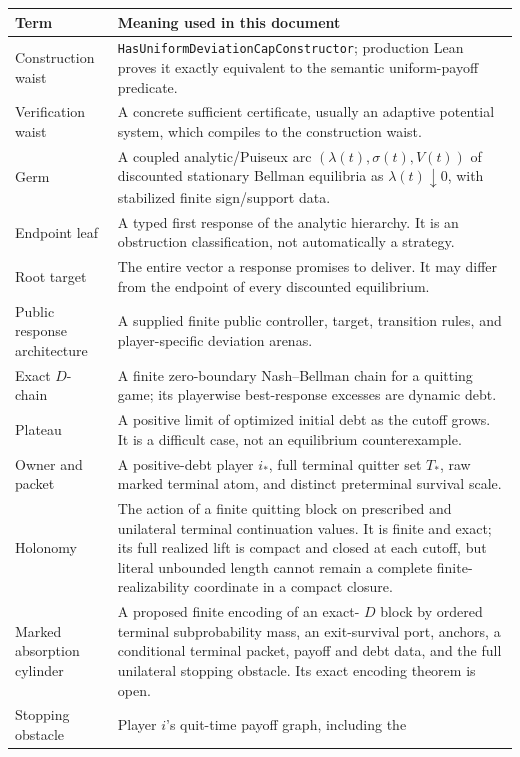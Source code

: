 \documentclass[11pt]{article}
\begin{document}
\begin{longtable}{@{}p{}p{}@{}}
\toprule
Term & Meaning used in this document\\
\midrule
\endhead
Construction waist & \texttt{HasUniformDeviationCapConstructor}; production
Lean proves it exactly equivalent to the semantic uniform-payoff predicate.\\
Verification waist & A concrete sufficient certificate, usually an adaptive
potential system, which compiles to the construction waist.\\
Germ & A coupled analytic/Puiseux arc
\((\lambda(t),\sigma(t),V(t))\) of discounted stationary Bellman equilibria
as \(\lambda(t)\downarrow0\), with stabilized finite sign/support data.\\
Endpoint leaf & A typed first response of the analytic hierarchy.  It is an
obstruction classification, not automatically a strategy.\\
Root target & The entire vector a response promises to deliver.  It may differ
from the endpoint of every discounted equilibrium.\\
Public response architecture & A supplied finite public controller, target,
transition rules, and player-specific deviation arenas.\\
Exact \(D\)-chain & A finite zero-boundary Nash--Bellman chain for a quitting
game; its playerwise best-response excesses are dynamic debt.\\
Plateau & A positive limit of optimized initial debt as the cutoff grows.
It is a difficult case, not an equilibrium counterexample.\\
Owner and packet & A positive-debt player \(i_*\), full terminal quitter set
\(T_*\), raw marked terminal atom, and distinct preterminal survival scale.\\
Holonomy & The action of a finite quitting block on prescribed and unilateral
terminal continuation values.  It is finite and exact; its full realized lift
is compact and closed at each cutoff, but literal unbounded length cannot
remain a complete finite-realizability coordinate in a compact closure.\\
Marked absorption cylinder & A proposed finite encoding of an exact-
\(D\) block by ordered terminal subprobability mass, an exit-survival port,
anchors, a conditional terminal packet, payoff and debt data, and the full
unilateral stopping obstacle.  Its exact encoding theorem is open.\\
Stopping obstacle & Player $i$'s quit-time payoff graph, including the

\end{longtable}
\end{document}
